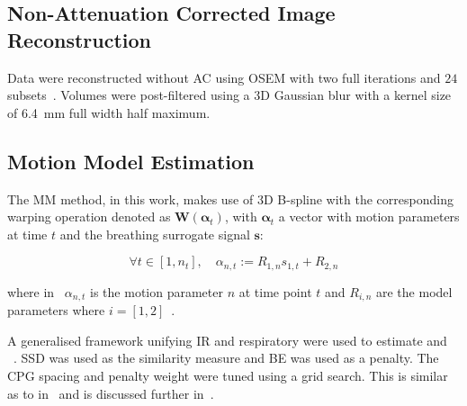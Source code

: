             \subsection{Non-Attenuation Corrected Image Reconstruction} \label{sec:pet_ct_respiratory_motion_correction_with_a_single_attenuation_map_using_nac_derived_deformation_fields_methods_non-attenuation_corrected_image_reconstruction}
                Data were reconstructed without \gls{AC} using \gls{OSEM} with two full iterations and $24$ subsets~.
                Volumes were post-filtered using a \gls{3D} Gaussian blur with a kernel size of \SI{6.4}{\milli\metre} full width half maximum.
            
            \subsection{Motion Model Estimation} \label{sec:pet_ct_respiratory_motion_correction_with_a_single_attenuation_map_using_nac_derived_deformation_fields_methods_motion_model_estimation}
                The \gls{MM} method, in this work, makes use of \gls{3D} B-spline  with the corresponding warping operation denoted as $\mathbf{W}(\mathbf{\alpha}_t)$, with $\mathbf{\alpha}_t$ a vector with motion parameters at time $t$ and the breathing surrogate signal $\mathbf{s}$:
                
                \begin{equation} \label{eq:pet_ct_respiratory_motion_correction_with_a_single_attenuation_map_using_nac_derived_deformation_fields_methods_motion_parameters}
                    \forall t \in [1, n_t],\quad \alpha_{n, t} := R_{1, n} s_{1, t} + R_{2, n}
                \end{equation}
                
                \noindent where in~ $\alpha_{n, t}$ is the motion parameter $n$ at time point $t$ and $R_{i, n}$ are the model parameters where $i = [1, 2]$~.
                
                A generalised framework unifying \gls{IR} and respiratory  were used to estimate  and ~. \gls{SSD} was used as the similarity measure and \gls{BE} was used as a penalty. The \gls{CPG} spacing and penalty weight were tuned using a grid search. This is similar as to in~ and is discussed further in~.
            
